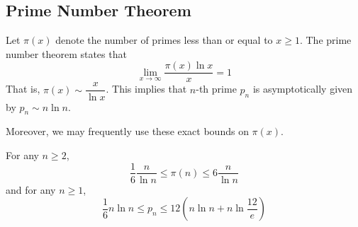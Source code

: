 \subsection{Prime Number Theorem}
\begin{theorem}\label{thm:pnt}
	Let \(\pi(x)\) denote the number of primes less than or equal to \(x \geq 1\). The prime number theorem states that 
	\begin{equation*}
		\lim_{x \to \infty} \dfrac{\pi(x) \ln x}{x} = 1
	\end{equation*}
	That is, \(\pi(x) \sim \dfrac{x}{\ln x}\). This implies that \(n\)-th prime \(p_n\) is asymptotically given by \(p_n \sim n \ln n\).
\end{theorem}

Moreover, we may frequently use these exact bounds on \(\pi(x)\).
\begin{lemma}\label{lmm:ineqpnt}
	For any \(n \geq 2\), 
	\begin{equation*}
		\dfrac{1}{6} \dfrac{n}{\ln n} \leq \pi(n) \leq 6 \dfrac{n}{\ln n}
	\end{equation*}
	and for any \(n \geq 1\),
	\begin{equation*}
		\dfrac{1}{6} n \ln n \leq p_n \leq 12 (n \ln n + n \ln \frac{12}{e})
	\end{equation*}
\end{lemma}


